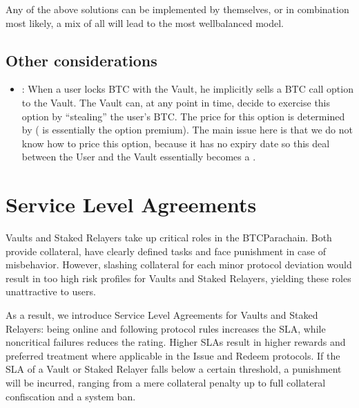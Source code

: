 \documentclass[a4paper,10pt,english]{sphinxmanual}
\begin{document}
Any of the above solutions can be implemented by themselves, or in combination \sphinxhyphen{} most likely, a mix of all will lead to the most well\sphinxhyphen{}balanced model.


\section{Other considerations}
\label{\detokenize{economics/fees:other-considerations}}\begin{itemize}
\item {} 
: When a user locks BTC with the Vault, he implicitly sells a BTC call option to the Vault. The Vault can, at any point in time, decide to exercise this option by “stealing” the user’s BTC. The price for this option is determined by  ( is essentially the option premium). The main issue here is that we do not know how to price this option, because it has no expiry date \sphinxhyphen{} so this deal between the User and the Vault essentially becomes a .

\end{itemize}


\chapter{Service Level Agreements}
\label{\detokenize{economics/SLA:service-level-agreements}}\label{\detokenize{economics/SLA:id1}}\label{\detokenize{economics/SLA::doc}}
Vaults and Staked Relayers take up critical roles in the BTC\sphinxhyphen{}Parachain. Both provide collateral, have clearly defined tasks and face punishment in case of misbehavior. However, slashing collateral for each minor protocol deviation would result in too high risk profiles for Vaults and Staked Relayers, yielding these roles unattractive to users.

As a result, we introduce Service Level Agreements for Vaults and Staked Relayers: being online and following protocol rules increases the SLA, while non\sphinxhyphen{}critical failures reduces the rating. Higher SLAs result in higher rewards and preferred treatment where applicable in the Issue and Redeem protocols. If the SLA of a Vault or Staked Relayer falls below a certain threshold, a punishment will be incurred, ranging from a mere collateral penalty up to full collateral confiscation and a system ban.
\end{document}
